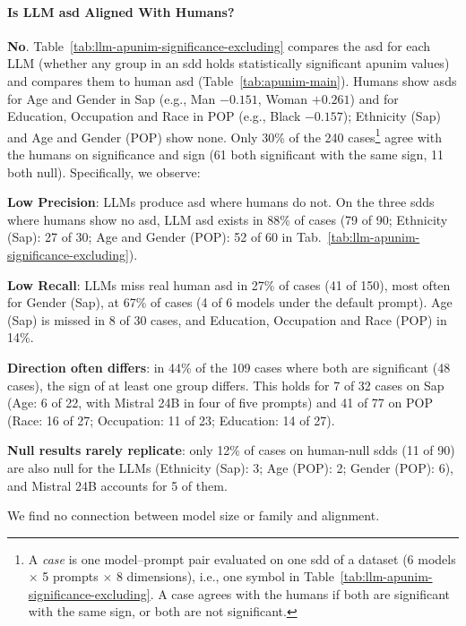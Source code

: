 \documentclass[manuscript,screen,review,anonymous]{acmart}
\theoremstyle{acmplain}
\theoremstyle{researchquestionstyle}
\begin{document}
\paragraph{Is LLM \ac{asd} Aligned With Humans?} \textbf{No}. Table~\ref{tab:llm-apunim-significance-excluding} compares the \ac{asd} for each LLM (whether any group in an \ac{sdd} holds statistically significant apunim values) and compares them to human \ac{asd} (Table~\ref{tab:apunim-main}). Humans show \acp{asd} for Age and Gender in Sap (e.g., Man $-0.151$, Woman $+0.261$) and for Education, Occupation and Race in POP (e.g., Black $-0.157$); Ethnicity (Sap) and Age and Gender (POP) show none. Only 30\% of the 240 cases\footnote{A \emph{case} is one model--prompt pair evaluated on one \ac{sdd} of a dataset (6 models $\times$ 5 prompts $\times$ 8 dimensions), i.e., one symbol in Table~\ref{tab:llm-apunim-significance-excluding}. A case agrees with the humans if both are significant with the same sign, or both are not significant.} agree with the humans on significance and sign (61 both significant with the same sign, 11 both null). Specifically, we observe:
\begin{enumerate*}
	\item \textbf{Low Precision}: LLMs produce \ac{asd} where humans do not. On the three \acp{sdd} where humans show no \ac{asd}, LLM \ac{asd} exists in 88\% of cases (79 of 90; Ethnicity (Sap): 27 of 30; Age and Gender (POP): 52 of 60 in Tab.~\ref{tab:llm-apunim-significance-excluding}).
	\item \textbf{Low Recall}: LLMs miss real human \ac{asd} in 27\% of cases (41 of 150), most often for Gender (Sap), at 67\% of cases (4 of 6 models under the default prompt). Age (Sap) is missed in 8 of 30 cases, and Education, Occupation and Race (POP) in 14\%.
	\item \textbf{Direction often differs}: in 44\% of the 109 cases where both are significant (48 cases), the sign of at least one group differs. This holds for 7 of 32 cases on Sap (Age: 6 of 22, with Mistral 24B in four of five prompts) and 41 of 77 on POP (Race: 16 of 27; Occupation: 11 of 23; Education: 14 of 27).
	\item \textbf{Null results rarely replicate}: only 12\% of cases on human-null \acp{sdd} (11 of 90) are also null for the LLMs (Ethnicity (Sap): 3; Age (POP): 2; Gender (POP): 6), and Mistral 24B accounts for 5 of them.
\end{enumerate*}
We find no connection between model size or family and alignment.
\end{document}
